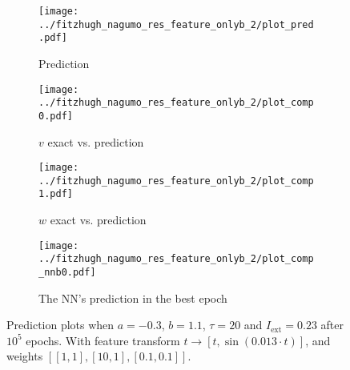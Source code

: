 \documentclass[a4paper]{article}
\begin{document}
\begin{figure}[H]
	\centering 
	\begin{subfigure}[b]{0.47\textwidth}
		\centering
		\texttt{[image: ../fitzhugh\_nagumo\_res\_feature\_onlyb\_2/plot\_pred.pdf]}
		\caption{Prediction}
		\label{fig:justb03a}
	\end{subfigure}
	\begin{subfigure}[b]{0.47\textwidth}
		\centering
		\texttt{[image: ../fitzhugh\_nagumo\_res\_feature\_onlyb\_2/plot\_comp0.pdf]}
		\caption{$v$ exact vs. prediction}
		\label{fig:justb03b}
	\end{subfigure}
	\begin{subfigure}[b]{0.47\textwidth}
		\centering
		\texttt{[image: ../fitzhugh\_nagumo\_res\_feature\_onlyb\_2/plot\_comp1.pdf]}
		\caption{$w$ exact vs. prediction}
		\label{fig:justb03c}
	\end{subfigure}
	\begin{subfigure}[b]{0.47\textwidth}
		\centering
		\texttt{[image: ../fitzhugh\_nagumo\_res\_feature\_onlyb\_2/plot\_comp\_nnb0.pdf]}
		\caption{The NN's prediction in the best epoch}
		\label{fig:justb03d}
	\end{subfigure}
	\caption{Prediction plots when $a=-0.3$, $b=1.1$, $\tau=20$ and $ I_{\text{ext}}=0.23$ after $10^5$ epochs. With feature transform $t \rightarrow \left[ t, \sin(0.013\cdot t) \right] $, and weights $\left[ \left[ 1, 1\right], \left[ 10, 1\right], \left[ 0.1, 0.1\right]\right]$.}
	\label{plot:justb03}
\end{figure} 	
\end{document}
